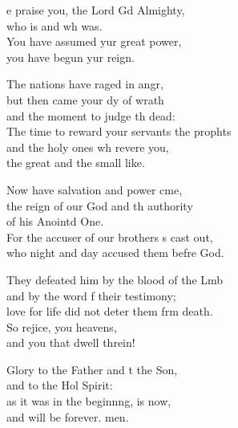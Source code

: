 \settowidth{\versewidth}{The time to reward your servants the prophets +}
\begin{psalmverse}%
  \begin{patverse}
e praise you, the Lord Gd Almighty,\Med\\
who is and wh was.\\
You have assumed yur great power,\Med\\
you have begun yur reign.

The nations have raged in angr,\Flex\\
but then came your dy of wrath\Med\\
and the moment to judge th dead:\\
The time to reward your servants the prophts\Flex\\
and the holy ones wh revere you,\Med\\
the great and the small like.

Now have salvation and power cme,\Flex\\
the reign of our God and th authority\Med\\
of his Anointd One.\\
For the accuser of our brothers \pointup{\i}s cast out,\Med\\
who night and day accused them befre God.

They defeated him by the blood of the Lmb\Flex\\
and by the word f their testimony;\Med\\
love for life did not deter them frm death.\\
So rejice, you heavens,\Med\\
and you that dwell threin!

Glory to the Father and t the Son,\Med\\
and to the Hol Spirit:\\
as it was in the beginn\pointup{\i}ng, is now,\Med\\
and will be forever. men. 
  \end{patverse}
\end{psalmverse}
